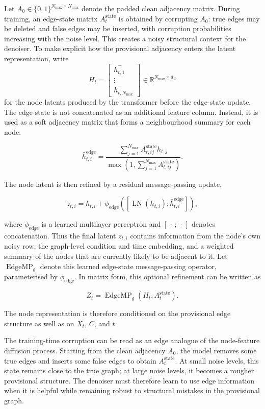 Let \(A_0\in\{0,1\}^{N_{\max}\times N_{\max}}\) denote the padded clean
adjacency matrix. During training, an edge-state matrix
\(A_t^{\mathrm{state}}\) is obtained by corrupting \(A_0\): true edges may be
deleted and false edges may be inserted, with corruption probabilities
increasing with the noise level. This creates a noisy structural context for
the denoiser. To make explicit how the provisional adjacency enters the latent
representation, write
\[
H_t
=
\begin{bmatrix}
h_{t,1}^{\top}\\
\vdots\\
h_{t,N_{\max}}^{\top}
\end{bmatrix}
\in
\mathbb{R}^{N_{\max}\times d_Z}
\]
for the node latents produced by the transformer before the edge-state update.
The edge state is not concatenated as an additional feature column. Instead,
it is used as a soft adjacency matrix that forms a neighbourhood summary for
each node.


\[
    \bar h^{\mathrm{edge}}_{t,i}
    =
    \frac{
        \sum_{j=1}^{N_{\max}}
        A^{\mathrm{state}}_{t,ij} h_{t,j}
    }{
        \max\left(1,\sum_{j=1}^{N_{\max}}
        A^{\mathrm{state}}_{t,ij}\right)
    }.
\]

The node latent is then refined by a residual message-passing update,

\[
    z_{t,i}
    =
    h_{t,i}
    +
    \phi_{\mathrm{edge}}
    \left(
        \left[
        \operatorname{LN}(h_{t,i});
        \bar h^{\mathrm{edge}}_{t,i}
        \right]
    \right),
\]

where \(\phi_{\mathrm{edge}}\) is a learned multilayer perceptron and
\([\,\cdot\,;\,\cdot\,]\) denotes concatenation. Thus the final latent
\(z_{t,i}\) contains information from the node's own noisy row, the graph-level
condition and time embedding, and a weighted summary of the nodes that are
currently likely to be adjacent to it. Let
\(\operatorname{EdgeMP}_\theta\) denote this learned edge-state
message-passing operator, parameterised by \(\phi_{\mathrm{edge}}\). In matrix
form, this optional refinement can be written as

\[
    Z_t = \operatorname{EdgeMP}_\theta(H_t,A_t^{\mathrm{state}}).
\]

The node representation is therefore conditioned on the provisional edge
structure as well as on \(X_t\), \(C\), and \(t\).

The training-time corruption can be read as an edge analogue of the
node-feature diffusion process. Starting from the clean adjacency \(A_0\), the
model removes some true edges and inserts some false edges to obtain
\(A_t^{\mathrm{state}}\). At small noise levels, this state remains close to
the true graph; at large noise levels, it becomes a rougher provisional
structure. The denoiser must therefore learn to use edge information when it is
helpful while remaining robust to structural mistakes in the provisional graph.

